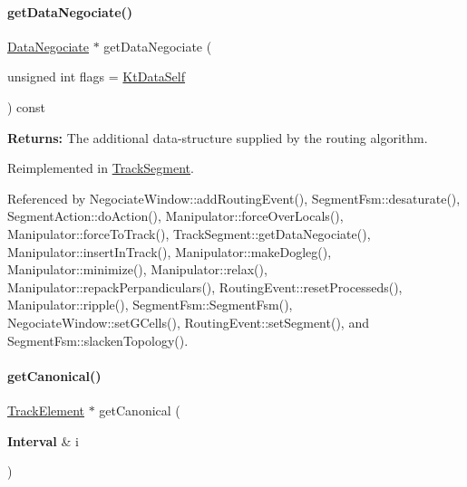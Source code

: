\mbox{\label{classKite_1_1TrackElement_acd0170a05128ec4af16ecd0060c3a3b5}} 
\paragraph{\texorpdfstring{get\+Data\+Negociate()}{getDataNegociate()}}
{\footnotesize\ttfamily \hyperlink{classKite_1_1DataNegociate}{Data\+Negociate} $\ast$ get\+Data\+Negociate (\begin{DoxyParamCaption}\item[{unsigned int}]{flags = {\ttfamily \hyperlink{namespaceKite_acca8fffa3182dea5f94208f454f14b47a68e917ff37d4b5cef906303181836404}{Kt\+Data\+Self}} }\end{DoxyParamCaption}) const\hspace{0.3cm}{\ttfamily [virtual]}}

{\bfseries Returns\+:} The additional data-\/structure supplied by the routing algorithm. 

Reimplemented in \hyperlink{classKite_1_1TrackSegment_acd0170a05128ec4af16ecd0060c3a3b5}{Track\+Segment}.



Referenced by Negociate\+Window\+::add\+Routing\+Event(), Segment\+Fsm\+::desaturate(), Segment\+Action\+::do\+Action(), Manipulator\+::force\+Over\+Locals(), Manipulator\+::force\+To\+Track(), Track\+Segment\+::get\+Data\+Negociate(), Manipulator\+::insert\+In\+Track(), Manipulator\+::make\+Dogleg(), Manipulator\+::minimize(), Manipulator\+::relax(), Manipulator\+::repack\+Perpandiculars(), Routing\+Event\+::reset\+Processeds(), Manipulator\+::ripple(), Segment\+Fsm\+::\+Segment\+Fsm(), Negociate\+Window\+::set\+G\+Cells(), Routing\+Event\+::set\+Segment(), and Segment\+Fsm\+::slacken\+Topology().

\mbox{\label{classKite_1_1TrackElement_af2d46d64cbd02bdbba53d5483d95e26d}} 
\paragraph{\texorpdfstring{get\+Canonical()}{getCanonical()}}
{\footnotesize\ttfamily \hyperlink{classKite_1_1TrackElement}{Track\+Element} $\ast$ get\+Canonical (\begin{DoxyParamCaption}\item[{\textbf{ Interval} \&}]{i }\end{DoxyParamCaption})\hspace{0.3cm}{\ttfamily [virtual]}}

